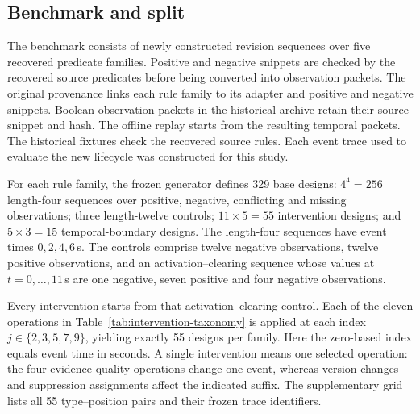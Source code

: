 \documentclass[preprint,11pt]{elsarticle}
\begin{document}
\subsection{Benchmark and split}
The benchmark consists of newly constructed revision sequences over five recovered predicate families. Positive and negative snippets are checked by the recovered source predicates before being converted into observation packets. The original provenance links each rule family to its adapter and positive and negative snippets. Boolean observation packets in the historical archive retain their source snippet and hash. The offline replay starts from the resulting temporal packets. The historical fixtures check the recovered source rules. Each event trace used to evaluate the new lifecycle was constructed for this study.

For each rule family, the frozen generator defines 329 base designs: $4^4=256$ length-four sequences over positive, negative, conflicting and missing observations; three length-twelve controls; $11\times5=55$ intervention designs; and $5\times3=15$ temporal-boundary designs. The length-four sequences have event times $0,2,4,6$\,s. The controls comprise twelve negative observations, twelve positive observations, and an activation--clearing sequence whose values at $t=0,\ldots,11$\,s are one negative, seven positive and four negative observations.

Every intervention starts from that activation--clearing control. Each of the eleven operations in Table~\ref{tab:intervention-taxonomy} is applied at each index $j\in\{2,3,5,7,9\}$, yielding exactly 55 designs per family. Here the zero-based index equals event time in seconds. A single intervention means one selected operation: the four evidence-quality operations change one event, whereas version changes and suppression assignments affect the indicated suffix. The supplementary grid lists all 55 type--position pairs and their frozen trace identifiers.
\end{document}

